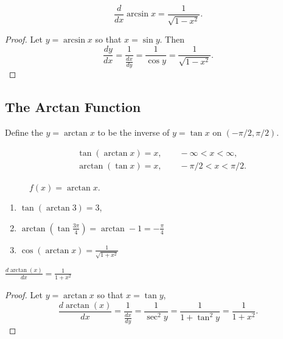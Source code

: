 \documentclass[calc1-main.tex]{subfiles}
\begin{document}
\begin{theorem}
\[
  \frac{d }{dx} \arcsin x = \frac{1}{\sqrt{1-x^2}}.
\]

\end{theorem}
\begin{proof}
  Let $y = \arcsin x$ so that $x = \sin y$. Then
  \[
    \frac{dy}{dx} = \frac{1}{\frac{dx}{dy}} = \frac{1}{\cos y} = \frac{1}{\sqrt{1-x^2}}.
  \]
\end{proof}

\subsection*{The Arctan Function}

Define the $y = \arctan x$ to be the inverse of $y=\tan x$ on $(-\pi/2, \pi/2)$.

\begin{align*}
  & \tan (\arctan x) = x, \qquad -\infty < x < \infty, \\
  & \arctan (\tan x) = x, \qquad -\pi/2 < x < \pi/2.
\end{align*}

\begin{figure}[H]
  \centering
  
  \caption{$f(x) = \arctan x$.}
\end{figure}

\begin{example}
  \begin{enumerate}
    \item $\tan (\arctan 3) = 3$,

    \item $\arctan (\tan \frac{3\pi}{4}) = \arctan -1 = -\frac{\pi}{4}$

    \item $\cos (\arctan x) = \frac{1}{\sqrt{1+x^2}}$

  \end{enumerate}
\end{example}

\begin{theorem}
  $\frac{d \arctan(x)}{dx} = \frac{1}{1+x^2}$
\end{theorem}

\begin{proof}
  Let $y=\arctan x$ so that $x = \tan y$,
  \[
    \frac{d \arctan(x)}{dx} = \frac{1}{\frac{dx}{dy}} = \frac{1}{\sec^2 y} = \frac{1}{1+ \tan^2 y} = \frac{1}{1+x^2}.
  \]
\end{proof}
\end{document}
